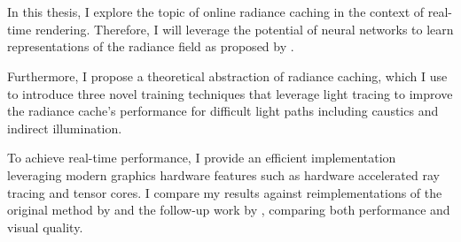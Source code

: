 

\chapter*{}
\label{sec:summary}

In this thesis, I explore the topic of online radiance caching in the context of real-time rendering.
Therefore, I will leverage the potential of neural networks to learn representations of the radiance field as proposed by \textcite{muller2021}.

Furthermore, I propose a theoretical abstraction of radiance caching, which I use to introduce three novel training techniques that leverage light tracing to improve the radiance cache's performance for difficult light paths including caustics and indirect illumination.

To achieve real-time performance, I provide an efficient implementation leveraging modern graphics hardware features such as hardware accelerated ray tracing and tensor cores.
I compare my results against reimplementations of the original method by \textcite{muller2021} and the follow-up work by \textcite{muller2022}, comparing both performance and visual quality.